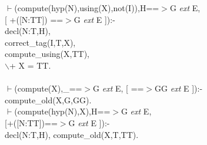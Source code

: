 \documentclass[11pt]{report}
\begin{document}
\begin{enumerate}
\begin{sf}
\begin{tabbing}
$\vdash$(compute(hyp(N),using(X),not(I)),H==$>$G \mbox{\it ext} E,\\[-0.15ex]
\hspace{4em}[ +([N:TT]) ==$>$G \mbox{\it ext} E ]):-\\[-0.15ex]
\hspace{2em}decl(N:T,H),\\[-0.15ex]
\hspace{2em}correct\_\hspace{0.1em}tag(I,T,X),\\[-0.15ex]
\hspace{2em}compute\_\hspace{0.1em}using(X,TT),\\[-0.15ex]
\hspace{2em}$\backslash$+ X = TT.  \\[-0.7ex]
\\[-0.15ex]
$\vdash$(compute(X),\_\hspace{0.1em}==$>$G \mbox{\it ext} E, [ ==$>$GG \mbox{\it ext} E ]):- \\[-0.15ex]
\hspace{2em}compute\_\hspace{0.1em}old(X,G,GG).\\[-0.15ex]
$\vdash$(compute(hyp(N),X),H==$>$G \mbox{\it ext} E, \\[-0.15ex]
\hspace{3em}[+([N:TT])==$>$G \mbox{\it ext} E  ]):-\\[-0.15ex]
\hspace{3em}decl(N:T,H), compute\_\hspace{0.1em}old(X,T,TT).
\end{tabbing}\end{sf}


\end{enumerate}
\end{document}
